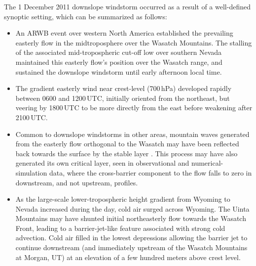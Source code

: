 \documentclass[pdftex,12pt]{article}
\begin{document}
The 1 December 2011 downslope windstorm occurred as a result of a well-defined synoptic setting, which can be summarized as follows:

\begin{itemize}
\item An ARWB event over western North America established the prevailing easterly flow in the midtroposphere over the Wasatch Mountains. The stalling of the associated mid-tropospheric cut-off low over southern Nevada maintained this easterly flow's position over the Wasatch range, and sustained the downslope windstorm until early afternoon local time.

\item The gradient easterly wind near crest-level (700\,hPa) developed rapidly between 0600 and 1200\,UTC, initially oriented from the northeast, but veering by 1800\,UTC to be more directly from the east before weakening after 2100\,UTC.

\item Common to downslope windstorms in other areas, mountain waves generated from the easterly flow orthogonal to the Wasatch may have been reflected back towards the surface by the stable layer \citep{Smith1985}. This process may have also generated its own critical layer, seen in observational and numerical-simulation data, where the cross-barrier component to the flow falls to zero \citep{Peltier1979} in downstream, and not upstream, profiles.

\item As the large-scale lower-tropospheric height gradient from Wyoming to Nevada increased during the day, cold air surged across Wyoming. The Uinta Mountains may have shunted initial northeasterly flow towards the Wasatch Front, leading to a barrier-jet-like feature associated with strong cold advection. Cold air filled in the lowest depressions allowing the barrier jet to continue downstream (and immediately upstream of the Wasatch Mountains at Morgan, UT) at an elevation of a few hundred meters above crest level.
\end{itemize}
\end{document}
